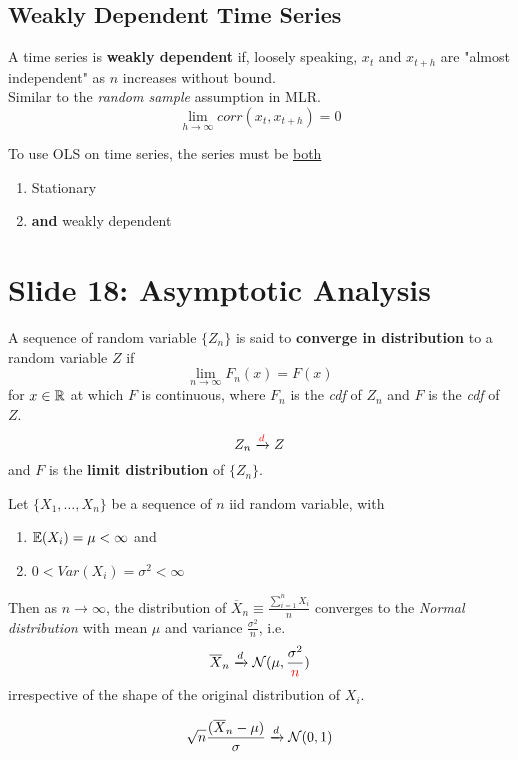 \documentclass[]{article}
\begin{document}
		\subsection{Weakly Dependent Time Series}
			\begin{definition}
				A time series is \textbf{weakly dependent} if, loosely speaking, $x_{t}$ and $x_{t+h}$ are "almost independent" as $n$ increases without bound. \\
				Similar to the \emph{random sample} assumption in MLR. \\
				\[
					\lim_{h\to \infty} corr(x_t, x_{t+h}) = 0
				\]
			\end{definition}
		\begin{remark}
			To use OLS on time series, the series must be \ul{both}
			\begin{enumerate}
				\item Stationary
				\item \textbf{and} weakly dependent
			\end{enumerate}
		\end{remark}
	
	\section{Slide 18: Asymptotic Analysis}
		\begin{definition}
			A sequence of random variable $\{Z_n\}$ is said to \textbf{converge in distribution} to a random variable $Z$ if 
			\[
				\lim_{n \to \infty} F_n(x) = F(x)
			\]
			for $x \in \mathbb{R}$ at which $F$ is continuous, where $F_n$ is the \emph{cdf} of $Z_n$ and $F$ is the \emph{cdf} of $Z$.
			\[
				Z_n \xrightarrow{\textcolor{red}{d}} Z
			\]
			and $F$ is the \textbf{limit distribution} of $\{Z_n\}$.
		\end{definition}
		
		\begin{theorem}
			Let $\{X_1, \dots, X_n\}$ be a sequence of $n$ iid random variable, with 
			\begin{enumerate}
				\item $\mathbb{E}({X_i}) = \mu < \infty$ and
				\item $0 < Var(X_i) = \sigma^2 < \infty$
			\end{enumerate}
			Then as $n \to \infty$, the distribution of $\overline{X}_n \equiv \frac{\sum_{i=1}^n X_i}{n}$ converges to the \emph{Normal distribution} with mean $\mu$ and variance $\frac{\sigma^2}{n}$, i.e.
			\[
				\overline{X}_n \xrightarrow{d} \mathcal{{N}}(\mu, \frac{\sigma^2}{\textcolor{red}{n}})
			\]
			irrespective of the shape of the original distribution of $X_i$.
		\end{theorem}
		\begin{corollary}
			\[
				\sqrt{n} \frac{(\overline{X}_n - \mu)}{\sigma} \xrightarrow{d} \mathcal{{N}}(0,1)
			\]
		\end{corollary}
		
\end{document}

